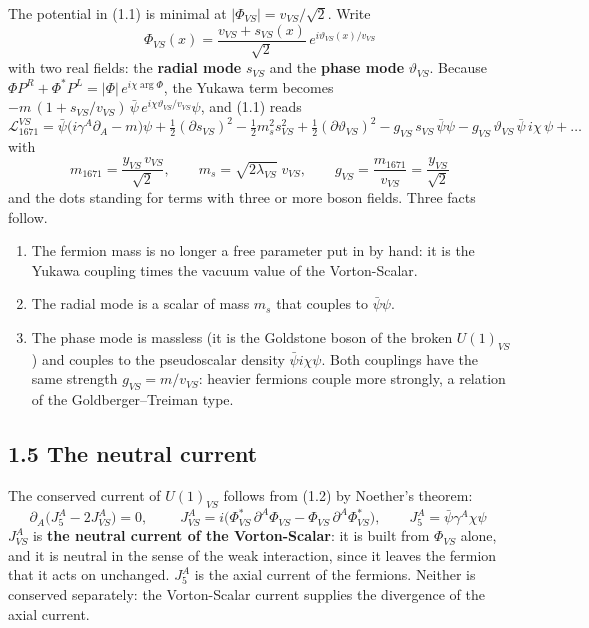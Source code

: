 \documentclass[
  10pt,
]{article}
\providecommand{\tightlist}{%
  \setlength{\itemsep}{0pt}\setlength{\parskip}{0pt}}
\begin{document}
The potential in (1.1) is minimal at \(|\Phi_{VS}|=v_{VS}/\sqrt2\).
Write
\[\Phi_{VS}(x)=\frac{v_{VS}+s_{VS}(x)}{\sqrt2}\,e^{i\vartheta_{VS}(x)/v_{VS}}\tag{1.3}\]
with two real fields: the \textbf{radial mode} \(s_{VS}\) and the
\textbf{phase mode} \(\vartheta_{VS}\). Because
\(\Phi P^{R}+\Phi^*P^{L}=|\Phi|\,e^{i\chi\arg\Phi}\), the Yukawa term
becomes
\(-m\,(1+s_{VS}/v_{VS})\,\bar\psi\,e^{i\chi\vartheta_{VS}/v_{VS}}\psi\),
and (1.1) reads
\[\mathcal L_{1671}^{VS}=\bar\psi\big(i\gamma^A\partial_A-m\big)\psi+\tfrac12(\partial s_{VS})^2-\tfrac12m_s^2s_{VS}^2+\tfrac12(\partial\vartheta_{VS})^2
-g_{VS}\,s_{VS}\,\bar\psi\psi-g_{VS}\,\vartheta_{VS}\,\bar\psi\,i\chi\,\psi+\dots\tag{1.4}\]
with
\[\boxed{\;m_{1671}=\frac{y_{VS}\,v_{VS}}{\sqrt2},\qquad m_s=\sqrt{2\lambda_{VS}}\;v_{VS},\qquad g_{VS}=\frac{m_{1671}}{v_{VS}}=\frac{y_{VS}}{\sqrt2}\;}\tag{1.5}\]
and the dots standing for terms with three or more boson fields. Three
facts follow.

\begin{enumerate}
\def\labelenumi{\arabic{enumi}.}
\tightlist
\item
  The fermion mass is no longer a free parameter put in by hand: it is
  the Yukawa coupling times the vacuum value of the Vorton-Scalar.
\item
  The radial mode is a scalar of mass \(m_s\) that couples to
  \(\bar\psi\psi\).
\item
  The phase mode is massless (it is the Goldstone boson of the broken
  \(U(1)_{VS}\)) and couples to the pseudoscalar density
  \(\bar\psi i\chi\psi\). Both couplings have the same strength
  \(g_{VS}=m/v_{VS}\): heavier fermions couple more strongly, a relation
  of the Goldberger--Treiman type.
\end{enumerate}

\hypertarget{the-neutral-current}{%
\subsection{1.5 The neutral current}\label{the-neutral-current}}

The conserved current of \(U(1)_{VS}\) follows from (1.2) by Noether's
theorem: \[\partial_A\big(J_5^A-2J_{VS}^A\big)=0,\qquad
\boxed{\;J_{VS}^A=i\big(\Phi_{VS}^{*}\,\partial^A\Phi_{VS}-\Phi_{VS}\,\partial^A\Phi_{VS}^{*}\big),\qquad J_{5}^A=\bar\psi\gamma^A\chi\psi\;}\tag{1.6}\]
\(J_{VS}^A\) is \textbf{the neutral current of the Vorton-Scalar}: it is
built from \(\Phi_{VS}\) alone, and it is neutral in the sense of the
weak interaction, since it leaves the fermion that it acts on unchanged.
\(J_5^A\) is the axial current of the fermions. Neither is conserved
separately: the Vorton-Scalar current supplies the divergence of the
axial current.
\end{document}
